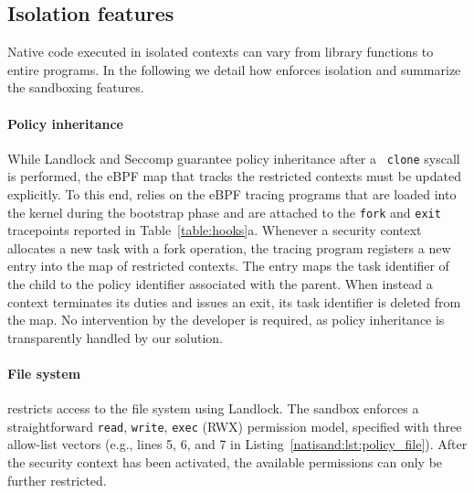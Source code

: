 \subsection{Isolation features}
\label{subsect:isolation}

Native code executed in isolated contexts can vary from library
functions to entire programs. In the following we detail how \natisand
enforces isolation and summarize the sandboxing features.

\paragraph{Policy inheritance}
While Landlock and Seccomp guarantee policy inheritance after a {\tt
  clone} syscall is performed, the eBPF map that tracks the
restricted contexts must be updated explicitly. To this end, \natisand
relies on the eBPF tracing programs that are loaded into the
kernel during the bootstrap phase and are attached to the {\tt fork}
and {\tt exit} tracepoints reported in
Table~\ref{table:hooks}a. Whenever a security context allocates a new
task with a fork operation, the tracing program registers
a new entry into the map of restricted contexts. The entry
  maps the task identifier of the child to the policy identifier
  associated with the parent. When instead a context terminates its
  duties and issues an exit, its task identifier is deleted from the
  map. No intervention by the developer is required, as policy
inheritance is transparently handled by our solution.

\paragraph{File system}
\natisand restricts access to the file system using Landlock. The sandbox
enforces a straightforward {\tt read}, {\tt write}, {\tt exec} (RWX)
permission model, specified with three allow-list vectors (e.g., lines
5, 6, and 7 in Listing~\ref{natisand:lst:policy_file}). After the security
context has been activated, the available permissions can only be
further restricted.

